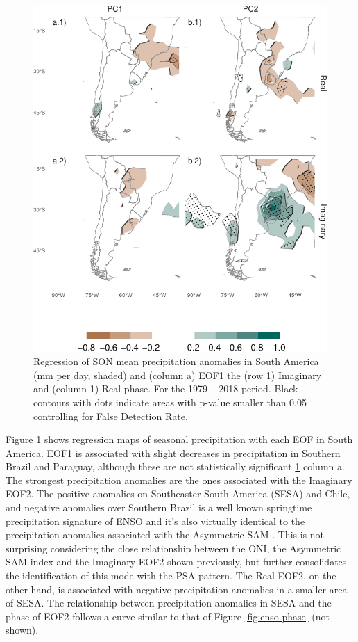 \documentclass[smallextended]{svjour3}       %
\begin{document}
\begin{figure}
\centering
\includegraphics{../figures/pp-america-1.pdf}
\caption{\label{fig:pp-america}Regression of SON mean precipitation anomalies in South America (mm per day, shaded) and (column a) EOF1 the (row 1) Imaginary and (column 1) Real phase. For the 1979 -- 2018 period. Black contours with dots indicate areas with p-value smaller than 0.05 controlling for False Detection Rate.}
\end{figure}

Figure \ref{fig:pp-america} shows regression maps of seasonal precipitation with each EOF in South America. EOF1 is associated with slight decreases in precipitation in Southern Brazil and Paraguay, although these are not statistically significant \ref{fig:pp-america} column a. The strongest precipitation anomalies are the ones associated with the Imaginary EOF2. The positive anomalies on Southeaster South America (SESA) and Chile, and negative anomalies over Southern Brazil is a well known springtime precipitation signature of ENSO \citep{cai2020a} and it's also virtually identical to the precipitation anomalies associated with the Asymmetric SAM \citep{campitelli2021}. This is not surprising considering the close relationship between the ONI, the Asymmetric SAM index and the Imaginary EOF2 shown previously, but further consolidates the identification of this mode with the PSA pattern. The Real EOF2, on the other hand, is associated with negative precipitation anomalies in a smaller area of SESA. The relationship between precipitation anomalies in SESA and the phase of EOF2 follows a curve similar to that of Figure \ref{fig:enso-phase} (not shown).
\end{document}
